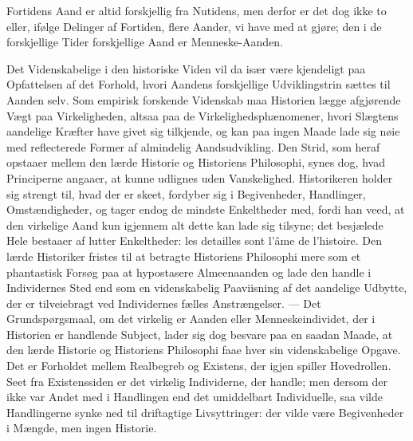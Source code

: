\documentclass[12pt]{book}
\newcommand{\apage}[1]{\marginnote{\footnotesize\textit{[#1]}}}
\begin{document}
Fortidens Aand er altid forskjellig fra Nutidens, men derfor er det dog ikke
to eller, ifølge Delinger af Fortiden, flere Aander, vi have med at gjøre;
den i de forskjellige Tider forskjellige Aand er Menneske-Aanden.

\apage{232} Det Videnskabelige i den historiske Viden vil da især være kjendeligt paa
Opfattelsen af det Forhold, hvori Aandens forskjellige Udviklingstrin
sættes til Aanden selv. Som empirisk forskende Videnskab maa Historien
lægge afgjørende Vægt paa Virkeligheden, altsaa paa de Virkelighedsphænomener,
hvori Slægtens aandelige Kræfter have givet sig tilkjende, og kan paa ingen
Maade lade sig nøie med reflecterede Former af almindelig Aandsudvikling.
Den Strid, som heraf opstaaer mellem den lærde Historie og Historiens
Philosophi, synes dog, hvad Principerne angaaer, at kunne udlignes uden
Vanskelighed. Historikeren holder sig strengt til, hvad der er skeet,
fordyber sig i Begivenheder, Handlinger, Omstændigheder, og tager endog de
mindste Enkeltheder med, fordi han veed, at den virkelige Aand kun igjennem
alt dette kan lade sig tilsyne; det besjælede Hele bestaaer af lutter
Enkeltheder: les detailles sont l'âme de l'histoire. Den lærde
Historiker fristes til at betragte Historiens Philosophi mere som et
phantastisk Forsøg paa at hypostasere Almeenaanden og lade den handle i
Individernes Sted end som en videnskabelig Paaviisning af det aandelige
Udbytte, der er tilveiebragt ved Individernes fælles Anstrængelser. --- Det
Grundspørgsmaal, om det virkelig er Aanden eller Menneskeindividet, der i
Historien er handlende Subject, lader sig dog besvare paa en saadan Maade,
at den lærde Historie og Historiens Philosophi faae hver sin videnskabelige
Opgave. Det er Forholdet mellem Realbegreb og Existens, der igjen spiller
Hovedrollen. Seet fra Existenssiden er det virkelig Individerne, \apage{233} der handle;
men dersom der ikke var Andet med i Handlingen end det umiddelbart
Individuelle, saa vilde Handlingerne synke ned til driftagtige
Livsyttringer: der vilde være Begivenheder i Mængde, men ingen Historie.
\end{document}
